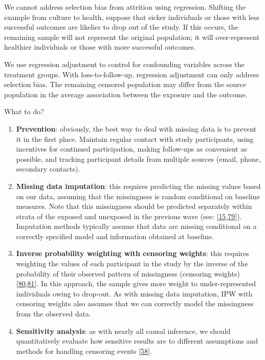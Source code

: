 \documentclass[
  singlecolumn]{article}
\begin{document}
We cannot address selection bias from attrition using regression.
Shifting the example from culture to health, suppose that sicker
individuals or those with less successful outcomes are likelier to drop
out of the study. If this occurs, the remaining sample will not
represent the original population; it will over-represent healthier
individuals or those with more successful outcomes.

We use regression adjustment to control for confounding variables across
the treatment groups. With loss-to-follow-up, regression adjustment can
only address selection bias. The remaining censored population may
differ from the source population in the average association between the
exposure and the outcome.

What to do?

\begin{enumerate}
\def\labelenumi{\arabic{enumi}.}
\item
  \textbf{Prevention}: obviously, the best way to deal with missing data
  is to prevent it in the first place. Maintain regular contact with
  study participants, using incentives for continued participation,
  making follow-ups as convenient as possible, and tracking participant
  details from multiple sources (email, phone, secondary contacts).
\item
  \textbf{Missing data imputation}: this requires predicting the missing
  values based on our data, assuming that the missingness is random
  conditional on baseline measures. Note that this missingness should be
  predicted separately within strata of the exposed and unexposed in the
  previous wave (see:
  {[}\protect\hyperlink{ref-westreich2015}{15},\protect\hyperlink{ref-zhang2023}{79}{]}).
  Imputation methods typically assume that data are missing conditional
  on a correctly specified model and information obtained at baseline.
\item
  \textbf{Inverse probability weighting with censoring weights}: this
  requires weighting the values of each participant in the study by the
  inverse of the probability of their observed pattern of missingness
  (censoring
  weights){[}\protect\hyperlink{ref-leyrat2019}{80},\protect\hyperlink{ref-cole2008}{81}{]}.
  In this approach, the sample gives more weight to under-represented
  individuals owing to drop-out. As with missing data imputation, IPW
  with censoring weights also assumes that we can correctly model the
  missingness from the observed data.
\item
  \textbf{Sensitivity analysis}: as with nearly all causal inference, we
  should quantitatively evaluate how sensitive results are to different
  assumptions and methods for handling censoring events
  {[}\protect\hyperlink{ref-shi2021}{58}{]}.
\end{enumerate}
\end{document}
